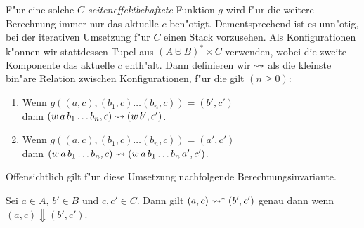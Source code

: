 \documentclass[12pt,a4paper]{article}
\begin{document}
F"ur eine solche \emph{$C$-seiteneffektbehaftete} Funktion $g$ wird f"ur die weitere Berechnung
immer nur das aktuelle $c$ ben"otigt. Dementsprechend ist es unn"otig, bei der iterativen Umsetzung
f"ur $C$ einen Stack vorzusehen. Als Konfigurationen k"onnen wir stattdessen Tupel aus
$(A \uplus B)^* \times C$ verwenden, wobei die zweite Komponente das aktuelle $c$ enth"alt. Dann
definieren wir $\rightsquigarrow$ als die kleinste bin"are Relation zwischen Konfigurationen, f"ur die gilt
$(n \ge 0)$:
\begin{enumerate}
\item Wenn $g((a,c),(b_1,c) \ldots (b_n,c)) = (b',c')$ \\
  dann $(w\,a\,b_1 \ldots b_n,c) \rightsquigarrow (w\,b',c')$.
\item Wenn $g((a,c),(b_1,c) \ldots (b_n,c)) = (a',c')$ \\
  dann $(w\,a\,b_1 \ldots b_n,c) \rightsquigarrow (w\,a\,b_1 \ldots b_n\,a',c')$.
\end{enumerate}
Offensichtlich gilt f"ur diese Umsetzung nachfolgende Berechnungsinvariante.

\begin{lemma}
  Sei $a \in A$, $b' \in B$ und $c,c' \in C$. Dann gilt $(a,c) \rightsquigarrow^* (b',c')$
  genau dann wenn $(a,c) \Downarrow (b',c')$.
\end{lemma}
\end{document}
